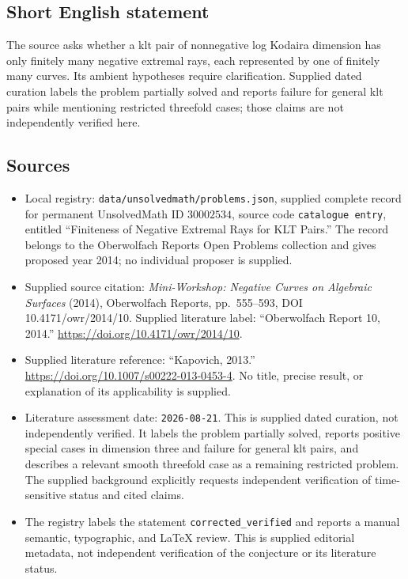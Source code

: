 \documentclass[11pt]{article}
\begin{document}
\subsection{Short English statement}
The source asks whether a klt pair of nonnegative log Kodaira dimension has only finitely many negative extremal rays, each represented by one of finitely many curves. Its ambient hypotheses require clarification. Supplied dated curation labels the problem partially solved and reports failure for general klt pairs while mentioning restricted threefold cases; those claims are not independently verified here.
\subsection{Sources}
\begin{itemize}
\item Local registry: \texttt{data/unsolvedmath/problems.json}, supplied complete record for permanent UnsolvedMath ID \(30002534\), source code \texttt{catalogue entry}, entitled ``Finiteness of Negative Extremal Rays for KLT Pairs.'' The record belongs to the Oberwolfach Reports Open Problems collection and gives proposed year 2014; no individual proposer is supplied.
\item Supplied source citation: \emph{Mini-Workshop: Negative Curves on Algebraic Surfaces} (2014), Oberwolfach Reports, pp.~555--593, DOI 10.4171/owr/2014/10. Supplied literature label: ``Oberwolfach Report 10, 2014.'' \url{https://doi.org/10.4171/owr/2014/10}.
\item Supplied literature reference: ``Kapovich, 2013.'' \url{https://doi.org/10.1007/s00222-013-0453-4}. No title, precise result, or explanation of its applicability is supplied.
\item Literature assessment date: \texttt{2026-08-21}. This is supplied dated curation, not independently verified. It labels the problem partially solved, reports positive special cases in dimension three and failure for general klt pairs, and describes a relevant smooth threefold case as a remaining restricted problem. The supplied background explicitly requests independent verification of time-sensitive status and cited claims.
\item The registry labels the statement \texttt{corrected\_verified} and reports a manual semantic, typographic, and LaTeX review. This is supplied editorial metadata, not independent verification of the conjecture or its literature status.
\end{itemize}
\end{document}
